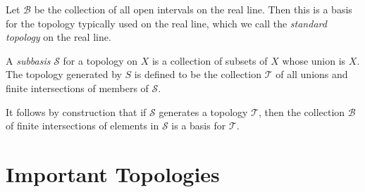 \begin{example}
	Let $\mathcal{B}$ be the collection of all open intervals on the real line.
	Then this is a basis for the topology typically used on the real line,
	which we call the \emph{standard topology} on the real line.
\end{example}
\begin{definition}
	\label{def:sub-basis}
	A \emph{subbasis} $\mathcal{S}$ for a topology on $X$ is a collection of subsets of
	$X$ whose union is $X$. The topology generated by $S$ is defined to be
	the collection $\mathcal{T}$ of all unions and finite intersections of members
	of $\mathcal{S}$.
\end{definition}
It follows by construction that if $\mathcal{S}$ generates a topology
$\mathcal{T}$, then the collection $\mathcal{B}$ of finite
intersections of elements in $\mathcal{S}$ is a basis for $\mathcal{T}$.
\section{Important Topologies}
